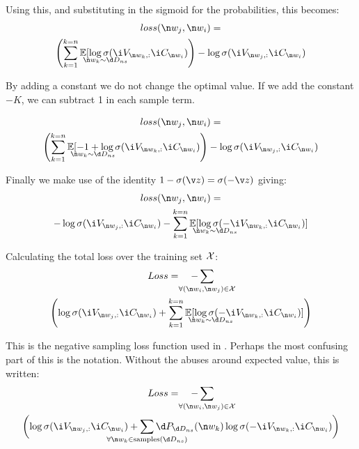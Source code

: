 {Using this, and substituting in the sigmoid for the probabilities, this becomes:
\begin{multline}
loss(\n w_j,\n w_i) = \\
\left(\sum_{k=1}^{k=n} \expected_{\n w_k \sim \d D_{ns}} [\log \sigma(\i V_{\n w_k,:}\i C_{\n w_i}) \right)
-\log \sigma(\i V_{\n w_j,:} \i C_{\n w_i})
\end{multline}

By adding a constant we do not change the optimal value.
If we add the constant $-K$, we can subtract 1 in each sample term.

\begin{multline}
loss(\n w_j,\n w_i) = \\
\left(\sum_{k=1}^{k=n} \expected_{\n w_k \sim \d D_{ns}} [-1 + \log \sigma(\i V_{\n w_k,:} \i C_{\n w_i}) \right)
-\log \sigma(\i V_{\n w_j,:}\i C_{\n w_i})
\end{multline}

Finally we make use of the identity $1-\sigma(\v z) = \sigma(-\v z)$ giving:
\begin{multline}
loss(\n w_j,\n w_i) = \\
-\log \sigma(\i V_{\n w_j,:} \i C_{\n w_i}) 
- \sum_{k=1}^{k=n} \expected_{\n w_k \sim \d D_{ns}} [\log \sigma(- \i V_{\n w_k,:} \i C_{\n w_i})] 
\end{multline}

Calculating the total loss over the training set $\mathcal{X}$:
\begin{multline}
Loss = \quad -\sum_{\mathclap{\forall (\n w_i,\n w_j)\in \seq{X}}}\\
\left(
\log \sigma(\i V_{\n w_j,:} \i C_{\n w_i}) 
+ \sum_{k=1}^{k=n} \expected_{\n w_k \sim \d D_{ns}} [\log \sigma(- \i V_{\n w_k,:} \i C_{\n w_i})] 
\right)
\end{multline}

This is the negative sampling loss function used in  \textcite{mikolovSkip}.
Perhaps the most confusing part of this is the notation.
Without the abuses around expected value, this is written:
\begin{multline}
Loss = \quad -\sum_{\mathclap{\forall (\n w_i,\n w_j)\in \seq{X}}}\\
\biggl( \log \sigma(\i V_{\n w_j,:} \i C_{\n w_i}) 
+ \sum_{\mathclap{\forall \n w_k \in \text{samples}(\d D_{ns})}}
\d P_{\d D_{ns}}(\n w_k) \log \sigma(- \i V_{\n w_k,:} \i C_{\n w_i})
\biggr)
\end{multline}



}
